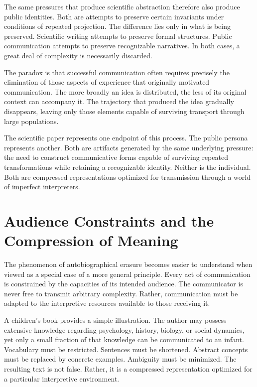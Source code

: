\documentclass[11pt]{article}
\theoremstyle{plain}
\begin{document}
The same pressures that produce scientific abstraction therefore also produce public identities. Both are attempts to preserve certain invariants under conditions of repeated projection. The difference lies only in what is being preserved. Scientific writing attempts to preserve formal structures. Public communication attempts to preserve recognizable narratives. In both cases, a great deal of complexity is necessarily discarded.

The paradox is that successful communication often requires precisely the elimination of those aspects of experience that originally motivated communication. The more broadly an idea is distributed, the less of its original context can accompany it. The trajectory that produced the idea gradually disappears, leaving only those elements capable of surviving transport through large populations.

The scientific paper represents one endpoint of this process. The public persona represents another. Both are artifacts generated by the same underlying pressure: the need to construct communicative forms capable of surviving repeated transformations while retaining a recognizable identity. Neither is the individual. Both are compressed representations optimized for transmission through a world of imperfect interpreters.

\section{Audience Constraints and the Compression of Meaning}

The phenomenon of autobiographical erasure becomes easier to understand when viewed as a special case of a more general principle. Every act of communication is constrained by the capacities of its intended audience. The communicator is never free to transmit arbitrary complexity. Rather, communication must be adapted to the interpretive resources available to those receiving it.

A children's book provides a simple illustration. The author may possess extensive knowledge regarding psychology, history, biology, or social dynamics, yet only a small fraction of that knowledge can be communicated to an infant. Vocabulary must be restricted. Sentences must be shortened. Abstract concepts must be replaced by concrete examples. Ambiguity must be minimized. The resulting text is not false. Rather, it is a compressed representation optimized for a particular interpretive environment.
\end{document}
